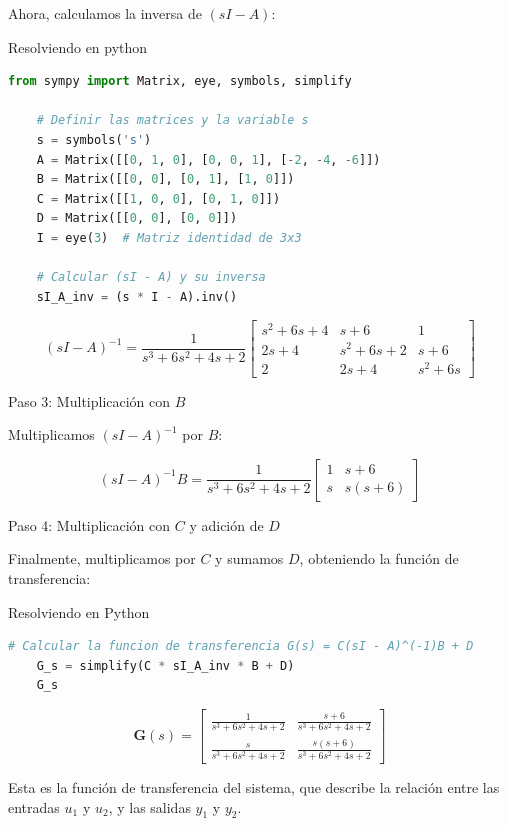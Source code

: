 \documentclass[10pt]{article}
\theoremstyle{definition}
\theoremstyle{remark}
\theoremstyle{definition}
\numberwithin{equation}{prob}
\begin{document}
Ahora, calculamos la inversa de \( (sI - A) \):

Resolviendo en python
\begin{lstlisting}[language=Python]
    from sympy import Matrix, eye, symbols, simplify

    # Definir las matrices y la variable s
    s = symbols('s')
    A = Matrix([[0, 1, 0], [0, 0, 1], [-2, -4, -6]])
    B = Matrix([[0, 0], [0, 1], [1, 0]])
    C = Matrix([[1, 0, 0], [0, 1, 0]])
    D = Matrix([[0, 0], [0, 0]])
    I = eye(3)  # Matriz identidad de 3x3
    
    # Calcular (sI - A) y su inversa
    sI_A_inv = (s * I - A).inv()
\end{lstlisting}

\[
	(sI - A)^{-1} = \frac{1}{s^3 + 6s^2 + 4s + 2} \begin{bmatrix}
		s^2 + 6s + 4 & s + 6        & 1        \\
		2s + 4       & s^2 + 6s + 2 & s + 6    \\
		2            & 2s + 4       & s^2 + 6s
	\end{bmatrix}
\]

Paso 3: Multiplicación con \( B \)

Multiplicamos \( (sI - A)^{-1} \) por \( B \):

\[
	(sI - A)^{-1}B = \frac{1}{s^3 + 6s^2 + 4s + 2} \begin{bmatrix}
		1 & s + 6    \\
		s & s(s + 6)
	\end{bmatrix}
\]

Paso 4: Multiplicación con \( C \) y adición de \( D \)

Finalmente, multiplicamos por \( C \) y sumamos \( D \), obteniendo la función de transferencia:

Resolviendo en Python
\begin{lstlisting}[language=Python]
    # Calcular la funcion de transferencia G(s) = C(sI - A)^(-1)B + D
    G_s = simplify(C * sI_A_inv * B + D)
    G_s
\end{lstlisting}
\[
	\mathbf{G}(s) = \begin{bmatrix}
		\frac{1}{s^3 + 6s^2 + 4s + 2} & \frac{s + 6}{s^3 + 6s^2 + 4s + 2}    \\
		\frac{s}{s^3 + 6s^2 + 4s + 2} & \frac{s(s + 6)}{s^3 + 6s^2 + 4s + 2}
	\end{bmatrix}
\]

Esta es la función de transferencia del sistema, que describe la relación entre las entradas \( u_1 \) y \( u_2 \), y las salidas \( y_1 \) y \( y_2 \).
\end{document}

